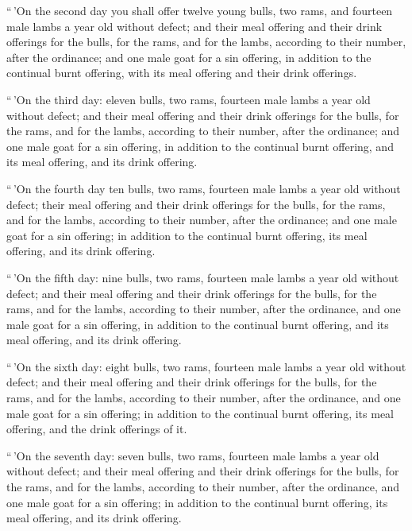  ``\,'On the second day you shall offer twelve young bulls,
two rams, and fourteen male lambs a year old without defect;
 and their meal offering and their drink offerings for the
bulls, for the rams, and for the lambs, according to their number, after
the ordinance;  and one male goat for a sin offering, in
addition to the continual burnt offering, with its meal offering and
their drink offerings.

 ``\,'On the third day: eleven bulls, two rams, fourteen
male lambs a year old without defect;  and their meal
offering and their drink offerings for the bulls, for the rams, and for
the lambs, according to their number, after the ordinance; 
and one male goat for a sin offering, in addition to the continual burnt
offering, and its meal offering, and its drink offering.

 ``\,'On the fourth day ten bulls, two rams, fourteen male
lambs a year old without defect;  their meal offering and
their drink offerings for the bulls, for the rams, and for the lambs,
according to their number, after the ordinance;  and one
male goat for a sin offering; in addition to the continual burnt
offering, its meal offering, and its drink offering.

 ``\,'On the fifth day: nine bulls, two rams, fourteen male
lambs a year old without defect;  and their meal offering
and their drink offerings for the bulls, for the rams, and for the
lambs, according to their number, after the ordinance,  and
one male goat for a sin offering, in addition to the continual burnt
offering, and its meal offering, and its drink offering.

 ``\,'On the sixth day: eight bulls, two rams, fourteen
male lambs a year old without defect;  and their meal
offering and their drink offerings for the bulls, for the rams, and for
the lambs, according to their number, after the ordinance, 
and one male goat for a sin offering; in addition to the continual burnt
offering, its meal offering, and the drink offerings of it.

 ``\,'On the seventh day: seven bulls, two rams, fourteen
male lambs a year old without defect;  and their meal
offering and their drink offerings for the bulls, for the rams, and for
the lambs, according to their number, after the ordinance, 
and one male goat for a sin offering; in addition to the continual burnt
offering, its meal offering, and its drink offering.

